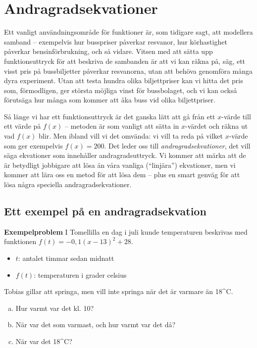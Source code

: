 \section{Andragradsekvationer}

Ett vanligt användningsområde för funktioner är, som tidigare sagt, att modellera samband -- exempelvis hur busspriser påverkar resvanor, hur körhastighet påverkar bensinförbrukning, och så vidare.
Vitsen med att sätta upp funktionsuttryck för att beskriva de sambanden är att vi kan räkna på, säg, ett visst pris på bussbiljetter påverkar resvanorna, utan att behöva genomföra många dyra experiment.
Utan att testa hundra olika biljettpriser kan vi hitta det pris som, förmodligen, ger största möjliga vinst för bussbolaget, och vi kan också förutsäga hur många som kommer att åka buss vid olika biljettpriser.

Så länge vi har ett funktionsuttryck är det ganska lätt att gå från ett $x$-värde till ett värde på $f(x)$ -- metoden är som vanligt att sätta in $x$-värdet och räkna ut vad $f(x)$ blir.
Men ibland vill vi det omvända: vi vill ta reda på vilket $x$-värde som ger exempelvis $f(x)=200$.
Det leder oss till \emph{andragradsekvationer}, det vill säga ekvationer som innehåller andragradsuttryck.
Vi kommer att märka att de är betydligt jobbigare att lösa än våra vanliga (``linjära'') ekvationer, men vi kommer att lära oss en metod för att lösa dem -- plus en smart genväg för att lösa några speciella andragradsekvationer.

\subsection{Ett exempel på en andragradsekvation}

\textbf{Exempelproblem}
I Tomellilla en dag i juli kunde temperaturen beskrivas med funktionen $f(t) = -0,1(x-13)^2+28$.
\begin{itemize}
  \item $t$: antalet timmar sedan midnatt
  \item $f(t)$: temperaturen i grader celsius
\end{itemize}

Tobias gillar att springa, men vill inte springa när det är varmare än 18^{\circ}C.

\begin{enumerate}[(a)]
  \item Hur varmt var det kl. 10?
  \item När var det som varmast, och hur varmt var det då?
  \item När var det 18^{\circ}C?
\end{enumerate}

